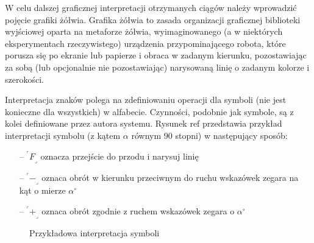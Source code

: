 \documentclass[a4paper,12pt,oneside]{book} %
\def\crnrs#1{$^\ulcorner#1_\lrcorner$}
\begin{document}
W celu dalszej graficznej interpretacji otrzymanych ciągów
należy wprowadzić pojęcie grafiki żółwia. Grafika żółwia
to zasada organizacji graficznej biblioteki wyjściowej oparta 
na metaforze żółwia, wyimaginowanego 
(a w niektórych eksperymentach rzeczywistego) urządzenia 
przypominającego robota, które porusza się po ekranie 
lub papierze i obraca w zadanym kierunku, 
pozostawiając za sobą (lub opcjonalnie nie pozostawiając) 
narysowaną linię o zadanym kolorze i szerokości.

Interpretacja znaków polega na zdefiniowaniu operacji dla symboli
(nie jest konieczne dla wszystkich) w alfabecie. Czynności, podobnie 
jak symbole, są z kolei definiowane
przez autora systemu. Rysunek ref przedstawia przykład interpretacji
symbolu (z kątem $\alpha$ równym 90 stopni) w następujący sposób:

\begin{itemize}
	\item[--] \crnrs{F} oznacza przejście do przodu i narysuj linię
	\item[--] \crnrs{-} oznaca obrót w kierunku przeciwnym do ruchu wskazówek zegara na kąt o mierze $\alpha^\circ$
	\item[--] \crnrs{+} oznaca obrót zgodnie z ruchem wskazówek zegara o $\alpha^\circ$ 
\end{itemize}

\begin{figure}[h]
	\begin{center}
	\end{center}
	\caption{Przykładowa interpretacja symboli}
	\label{fig:interpret}
\end{figure}
\end{document}
